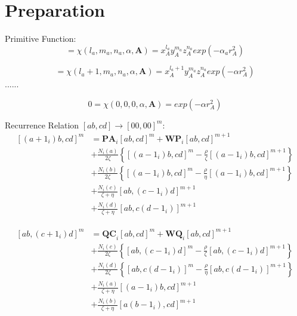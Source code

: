 \documentclass{article}
\begin{document}
\section{Preparation}
Primitive Function:
\begin{equation}
    [a]=\chi(l_a,m_a,n_a,\alpha,\mathbf{A})=x_A^{l_a}y_A^{m_a}z_A^{n_a} exp(-\alpha_a r_A^2)
\end{equation}

\begin{equation}
    [a+1_x]=\chi(l_a+1,m_a,n_a,\alpha,\mathbf{A})=x_A^{l_a+1}y_A^{m_a}z_A^{n_a} exp(-\alpha r_A^2)
\end{equation}
......

\begin{equation}
    0=\chi(0,0,0,\alpha,\mathbf{A})=exp(-\alpha r_A^2)
\end{equation}


Recurrence Relation \( [ab,cd] \rightarrow [00,00]^m \):
    \begin{equation}
    \begin{split}
        [(a+1_i)b, cd]^m &= \mathbf{PA}_i[ab,cd]^m + \mathbf{WP}_i[ab,cd]^{m+1} \\
                         &+ \frac{N_i(a)}{2\zeta}\left\{ [(a-1_i)b,cd]^m - \frac{\rho}{\zeta}[(a-1_i)b,cd]^{m+1}\right\} \\
                         &+ \frac{N_i(b)}{2\zeta}\left\{ [(a-1_i)b,cd]^m - \frac{\rho}{\eta}[(a-1_i)b,cd]^{m+1}\right\} \\
                         &+ \frac{N_i(c)}{\zeta+\eta}[ab,(c-1_i)d]^{m+1} \\
                         &+ \frac{N_i(d)}{\zeta+\eta}[ab,c(d-1_i)]^{m+1}
    \end{split}
    \end{equation}
    
    \begin{equation}
    \begin{split}
        [ab, (c+1_i)d]^m &= \mathbf{QC}_i[ab,cd]^m + \mathbf{WQ}_i[ab,cd]^{m+1} \\
                         &+ \frac{N_i(c)}{2\zeta}\left\{ [ab,(c-1_i)d]^m - \frac{\rho}{\zeta}[ab,(c-1_i)d]^{m+1}\right\} \\
                         &+ \frac{N_i(d)}{2\zeta}\left\{ [ab,c(d-1_i)]^m - \frac{\rho}{\eta}[ab,c(d-1_i)]^{m+1}\right\} \\
                         &+ \frac{N_i(a)}{\zeta+\eta}[(a-1_i)b,cd]^{m+1} \\
                         &+ \frac{N_i(b)}{\zeta+\eta}[a(b-1_i),cd]^{m+1}
    \end{split}
    \end{equation}
\end{document}
